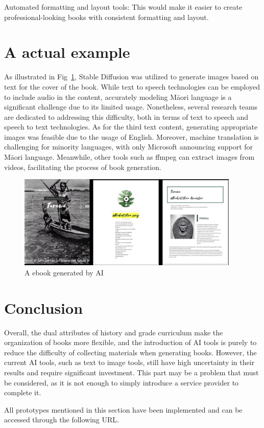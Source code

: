 Automated formatting and layout tools: This would make it easier to create professional-looking books with consistent formatting and layout.

\section{A actual example}

As illustrated in Fig~\ref{s-3}, Stable Diffusion\autocite{StableDi96:online} was utilized to generate images based on text for the cover of the book. 
While text to speech technologies can be employed to include audio in the content, accurately modeling Māori language is a significant challenge due to its limited usage. 
Nonetheless, several research teams\autocite{PapaReo84:online} \autocite{KaituhiA38:online} are dedicated to addressing this difficulty, both in terms of text to speech and speech to text technologies. 
As for the third text content, generating appropriate images was feasible due to the usage of English. 
Moreover, machine translation is challenging for minority languages, with only Microsoft announcing support for Māori language\autocite{Kiaorate17:online}. 
Meanwhile, other tools such as ffmpeg can extract images from videos, facilitating the process of book generation.

\begin{figure}[htbp]
  \centerline{\includegraphics[width=300pt]{images/s-3.jpg}}
  \caption{A ebook generated by AI}
  \label{s-3}
\end{figure}

\section{Conclusion}
Overall, the dual attributes of history and grade curriculum make the organization of books more flexible, and the introduction of AI tools is purely to reduce the difficulty of collecting materials when generating books. 
However, the current AI tools, such as text to image tools, still have high uncertainty in their results and require significant investment. 
This part may be a problem that must be considered, as it is not enough to simply introduce a service provider to complete it.

All prototypes mentioned in this section have been implemented and can be accessed through the following URL\autocite{Page1wh37:online}.